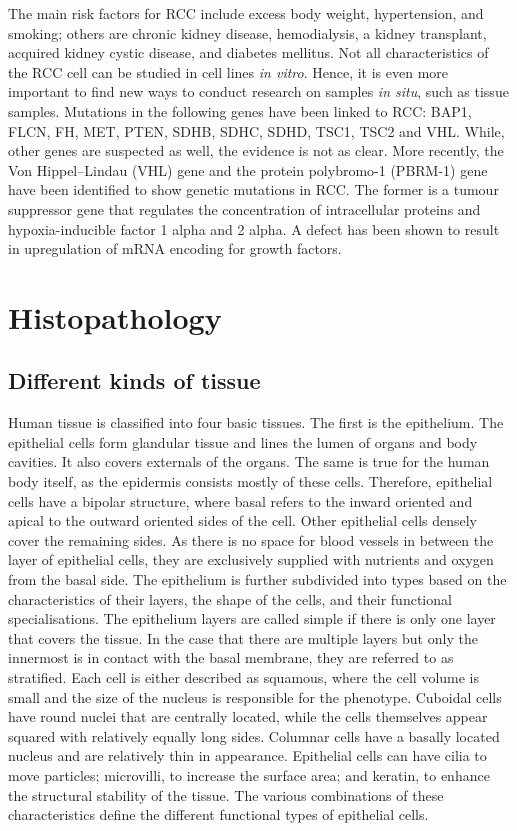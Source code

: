 The main risk factors for RCC include excess body weight, hypertension, and smoking; others are chronic kidney disease, hemodialysis, a kidney transplant, acquired kidney cystic disease, and diabetes mellitus.
Not all characteristics of the RCC cell can be studied in cell lines \textit{in vitro}. Hence, it is even more important to find new ways to conduct research on samples \textit{in situ}, such as tissue samples.
Mutations in the following genes have been linked to RCC: BAP1, FLCN, FH, MET, PTEN, SDHB, SDHC, SDHD, TSC1, TSC2 and VHL. While, other genes are suspected as well, the evidence is not as clear. \cite{Hsieh2017Renal}
More recently, the Von Hippel–Lindau (VHL) gene and the protein polybromo-1 (PBRM-1) gene have been identified to show genetic mutations in RCC. The former is a tumour suppressor gene that regulates the concentration of intracellular proteins and hypoxia-inducible factor 1 alpha and 2 alpha. A defect has been shown to result in upregulation of mRNA encoding for growth factors. \cite{Padala2022Clear}


\section{Histopathology}

\subsection{Different kinds of tissue}

Human tissue is classified into four basic tissues. 
The first is the epithelium. The epithelial cells form glandular tissue and lines the lumen of organs and body cavities. It also covers externals of the organs. The same is true for the human body itself, as the epidermis consists mostly of these cells. Therefore, epithelial cells have a bipolar structure, where basal refers to the inward oriented and apical to the outward oriented sides of the cell. Other epithelial cells densely cover the remaining sides. 
As there is no space for blood vessels in between the layer of epithelial cells, they are exclusively supplied with nutrients and oxygen from the basal side. The epithelium is further subdivided into types based on the characteristics of their layers, the shape of the cells, and their functional specialisations. The epithelium layers are called simple if there is only one layer that covers the tissue. In the case that there are multiple layers but only the innermost is in contact with the basal membrane, they are referred to as stratified. Each cell is either described as squamous, where the cell volume is small and the size of the nucleus is responsible for the phenotype. Cuboidal cells have round nuclei that are centrally located, while the cells themselves appear squared with relatively equally long sides. Columnar cells have a basally located nucleus and are relatively thin in appearance. Epithelial cells can have cilia to move particles; microvilli, to increase the surface area; and keratin, to enhance the structural stability of the tissue. 
The various combinations of these characteristics define the different functional types of epithelial cells.

